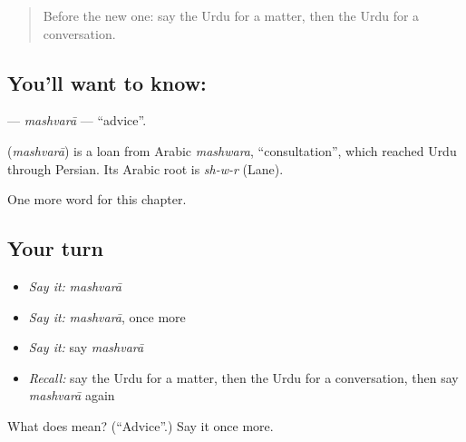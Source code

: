 \label{lesson:UR-C204-mashvara}



\begin{quote}
Before the new one: say the Urdu for a matter, then the Urdu for a conversation.
\end{quote}

\subsection*{You'll want to know: }
\textbf{} — \emph{mashvarā} — \textquotedblleft{}advice\textquotedblright{}.

\begin{cousinweb}
\textbf{} (\emph{mashvarā}) is a loan from Arabic \emph{mashwara}, \textquotedblleft{}consultation\textquotedblright{}, which reached Urdu through Persian. Its Arabic root is \emph{sh-w-r} (Lane).
\end{cousinweb}

\begin{grammarlens}[title={What you've built}]
One more word for this chapter.
\end{grammarlens}

\subsection*{Your turn}
\begin{itemize}
\raggedright
  \item \emph{Say it:} \emph{mashvarā}
  \item \emph{Say it:} \emph{mashvarā}, once more
  \item \emph{Say it:} say \emph{mashvarā}
  \item \emph{Recall:} say the Urdu for a matter, then the Urdu for a conversation, then say \emph{mashvarā} again
\end{itemize}

\begin{tcolorbox}[breakable,colback=teal!4,colframe=teal!35!black,title={Before you move on}]
What does  mean? (\textquotedblleft{}Advice\textquotedblright{}.) Say it once more.
\end{tcolorbox}
